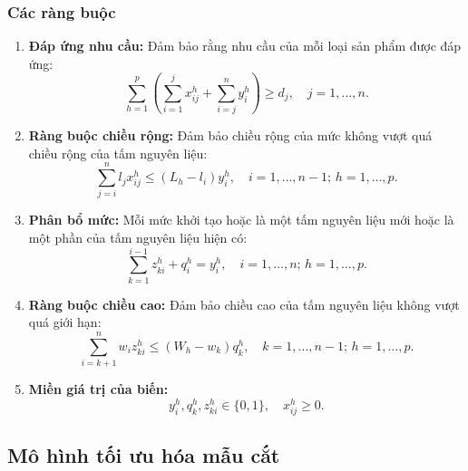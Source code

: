 \subsubsection{Các ràng buộc}  
\begin{enumerate}  
    \item \textbf{Đáp ứng nhu cầu:} Đảm bảo rằng nhu cầu của mỗi loại sản phẩm được đáp ứng:  
    \[
    \sum_{h=1}^{p} \left( \sum_{i=1}^{j} x_{ij}^h + \sum_{i=j}^{n} y_i^h \right) \geq d_j, \quad j = 1, \dots, n.
    \]  

    \item \textbf{Ràng buộc chiều rộng:} Đảm bảo chiều rộng của mức không vượt quá chiều rộng của tấm nguyên liệu:  
    \[
    \sum_{j=i}^{n} l_j x_{ij}^h \leq (L_h - l_i) y_i^h, \quad i = 1, \dots, n-1; \, h = 1, \dots, p.
    \]  

    \item \textbf{Phân bổ mức:} Mỗi mức khởi tạo hoặc là một tấm nguyên liệu mới hoặc là một phần của tấm nguyên liệu hiện có:  
    \[
    \sum_{k=1}^{i-1} z_{ki}^h + q_i^h = y_i^h, \quad i = 1, \dots, n; \, h = 1, \dots, p.
    \]  

    \item \textbf{Ràng buộc chiều cao:} Đảm bảo chiều cao của tấm nguyên liệu không vượt quá giới hạn:  
    \[
    \sum_{i=k+1}^{n} w_i z_{ki}^h \leq (W_h - w_k) q_k^h, \quad k = 1, \dots, n-1; \, h = 1, \dots, p.
    \]  

    \item \textbf{Miền giá trị của biến:}  
    \[
    y_i^h, q_k^h, z_{ki}^h \in \{0, 1\}, \quad x_{ij}^h \geq 0.
    \]  
\end{enumerate}  

\subsection{Mô hình tối ưu hóa mẫu cắt}  

